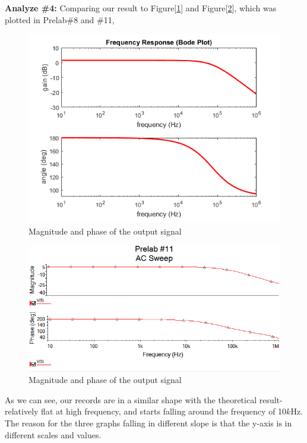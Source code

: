 \textbf{Analyze \#4:} \newline
\phantom{ } Comparing our result to Figure[\ref{fig:pre8}] and Figure[\ref{fig:pre11}], which was plotted in Prelab\#8 and \#11, 
\begin{figure}[!htbp]
	\centering 
	\begin{framed}
		\includegraphics[width=\linewidth]{prelab/images/9_1.PNG} 
		\caption{Magnitude and phase of the output signal}
		\label{fig:pre8} 
	\end{framed}
\end{figure} 
\begin{figure}[!htbp]
	\centering 
	\begin{framed}
		\includegraphics[width=\linewidth]{prelab/images/11_1.PNG} 
		\caption{Magnitude and phase of the output signal}
		\label{fig:pre11} 
	\end{framed}
\end{figure}
\phantom{ } As we can see, our records are in a similar shape with the theoretical result-relatively flat at high frequency, and starts falling around the frequency of 10$ \si{k\hertz} $. The reason for the three graphs falling in different slope is that the y-axis is in different scales and values.\\

